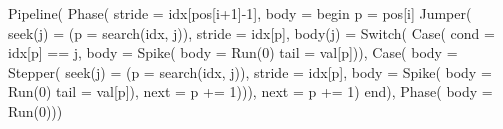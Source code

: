 \begin{juliacode}
Pipeline(
  Phase(
    stride = idx[pos[i+1]-1],
    body = begin
      p = pos[i]
      Jumper(
        seek(j) = (p = search(idx, j)),
        stride = idx[p],
        body(j) = Switch(
          Case(
            cond = idx[p] == j,
            body = Spike(
              body = Run(0)
              tail = val[p])),
          Case(
            body = Stepper(
              seek(j) =
                (p = search(idx, j)),
              stride = idx[p],
              body = Spike(
                body = Run(0)
                tail = val[p]),
              next = p += 1))),
        next = p += 1)
    end),
  Phase(
    body = Run(0)))
\end{juliacode}